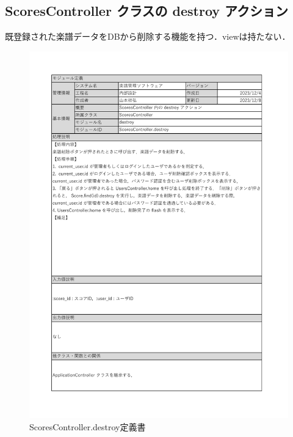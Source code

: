\subsection*{ScoresController クラスの destroy アクション}
既登録された楽譜データをDBから削除する機能を持つ．viewは持たない．
\begin{figure}[H]
	\centering
	\includegraphics[scale=0.6]{img/Scores/xlsx/ScoresController_destroy.pdf}
	\vspace{-1cm}
	\caption{ScoresController.destroy定義書}
\end{figure}
